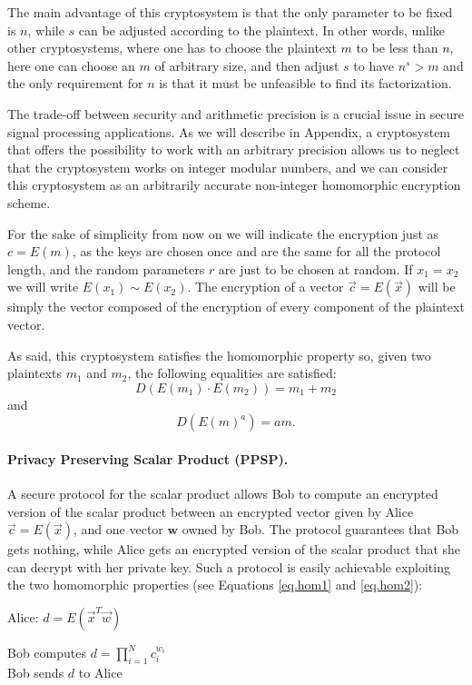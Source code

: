 \documentclass[11pt,oribibl,runningheads]{llncs}
\begin{document}
The main advantage of this cryptosystem is that the only parameter
to be fixed is $n$, while $s$ can be adjusted according to the
plaintext. In other words, unlike other cryptosystems, where one has
to choose the plaintext $m$ to be less than $n$, here one can choose
an $m$ of arbitrary size, and then adjust $s$ to have $n^s
> m$ and the only requirement for $n$ is that it must be unfeasible to find its factorization.

The trade-off between security and arithmetic precision is a crucial
issue in secure signal processing applications. As we will describe
in Appendix, a cryptosystem that offers the
possibility to work with an arbitrary precision allows us to neglect
that the cryptosystem works on integer modular numbers, and we can
consider this cryptosystem as an arbitrarily accurate non-integer
homomorphic encryption scheme.

For the sake of simplicity from now on we will indicate the
encryption just as $c=E(m)$, as the keys are chosen once and are
the same for all the protocol length, and the random parameters
$r$ are just to be chosen at random. If $x_1=x_2$ we will write
$E(x_1) \sim E(x_2)$. The encryption of a vector
$\vec{c}=E(\vec{x})$ will be simply the vector composed of the
encryption of every component of the plaintext vector.

As said, this cryptosystem satisfies the homomorphic property so,
given two plaintexts $m_1$ and $m_2$, the following equalities are
satisfied:
\begin{equation}
    D(E(m_1)\cdot E(m_2))=m_1+m_2
\label{eq.hom1}
\end{equation}
%
and
%
\begin{equation}
    D(E(m)^a)=am.
\label{eq.hom2}
\end{equation}

\paragraph{Privacy Preserving Scalar Product (PPSP).} A
secure protocol for the scalar product allows Bob to compute an
encrypted version of the scalar product between an encrypted
vector given by Alice $\vec{c}=E(\vec{x})$, and one vector
$\mathbf{w}$ owned by Bob. The protocol guarantees that Bob gets
nothing, while Alice gets an encrypted version of the scalar
product that she can decrypt with her private key. Such a protocol
is easily achievable exploiting the two homomorphic properties
(see Equations \ref{eq.hom1} and \ref{eq.hom2}):
%
\begin{algorithm}
%
\label{alg:PPSP}
 {Alice: $d=E(\vec{x}^T\vec{w})$}
%
\begin{algtab}
Bob computes $d = \prod_{i=1}^N c_i^{w_i}$ \\
Bob sends $d$ to Alice \\
\end{algtab}
\end{algorithm}
%
\end{document}
